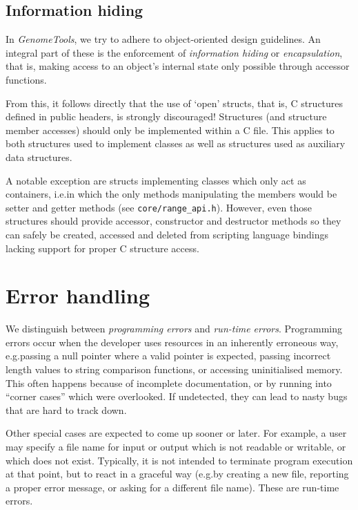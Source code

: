 \documentclass[11pt,final]{article}
\newcommand{\keyword}[1]{\lstinline{#1}}
\newcommand{\Gt}[0]{\emph{GenomeTools}\xspace}
\begin{document}
\subsection{Information hiding}
In \Gt, we try to adhere to object-oriented design guidelines. An integral
part of these is the enforcement of \emph{information hiding} or
\emph{encapsulation}, that is, making access to an object's internal state
only possible through accessor functions.

From this, it follows directly that the use of `open' structs, that is, C
structures defined in public headers, is strongly discouraged! Structures (and
structure member accesses) should only be implemented within a C file. This
applies to both structures used to implement classes as well as structures used
as auxiliary data structures.

A notable exception are structs implementing classes which only act as
containers, i.e.\@ in which the only methods manipulating the members would be
setter and getter methods (see \keyword{core/range_api.h}).
However, even those structures should provide accessor, constructor and
destructor methods so they can safely be created, accessed and deleted from
scripting language bindings lacking support for proper C structure access.



\section{Error handling}
We distinguish between \emph{programming errors} and \emph{run-time errors}.
Programming errors occur when the developer uses resources in an inherently
erroneous way, e.g.\@ passing a null pointer where a valid pointer is expected,
passing incorrect length values to string comparison functions, or accessing
uninitialised memory. This often happens because of incomplete documentation,
or by running into ``corner cases'' which were overlooked. If undetected, they
can lead to nasty bugs that are hard to track down.

Other special cases are expected to come up sooner or later. For example, a user
may specify a file name for input or output which is not readable or writable,
or which does not exist. Typically, it is not intended to terminate program
execution at that point, but to react in a graceful way (e.g.\@ by creating a new
file, reporting a proper error message, or asking for a different file name).
These are run-time errors.
\end{document}

